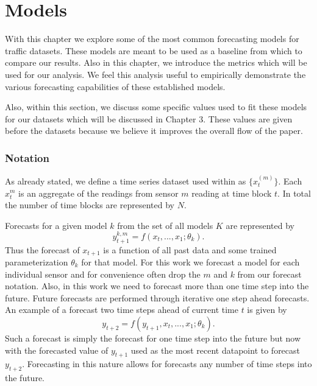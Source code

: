 \chapter{Models}
With this chapter we explore some of the most common forecasting models for traffic datasets.  These models are meant to be used as a baseline from which to compare our results. Also in this chapter, we introduce the metrics which will be used for our analysis.  We feel this analysis useful to empirically demonstrate the various forecasting capabilities of these established models.

Also, within this section, we discuss some specific values used to fit these models for our datasets which will be discussed in Chapter 3.  These values are given before the datasets because we believe it improves the overall flow of the paper.

\subsection{Notation}
As already stated, we define a time series dataset used within as  $\{x_{t}^{(m)}\}$.  Each $x_{t}^{m}$ is an aggregate of the readings from sensor $m$ reading at time block $t$.  In total the number of time blocks are represented by $N$.

Forecasts for a given model $k$ from the set of all models $K$ are represented by 
\begin{equation}
y_{t + 1}^{k, m} = f(x_{t}, ..., x_{1}; \theta_{k}).
\end{equation}
\noindent
Thus the forecast of $x_{t + 1}$ is a function of all past data and some trained parameterization $\theta_{k}$ for that model.  For this work we forecast a model for each individual sensor and for convenience often drop the $m$ and $k$ from our forecast notation.  Also, in this work we need to forecast more than one time step into the future.  Future forecasts are performed through iterative one step ahead forecasts.    An example of a forecast two time steps ahead of current time $t$ is given by 
\begin{equation}
y_{t + 2} = f(y_{t + 1}, x_{t}, ..., x_{1}; \theta_{k}).
\end{equation}
\noindent
Such a forecast is simply the forecast for one time step into the future but now with the forecasted value of $y_{t + 1}$ used as the most recent datapoint to forecast $y_{t + 2}$.  Forecasting in this nature allows for forecasts any number of time steps into the future.

